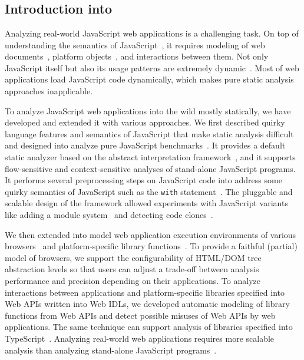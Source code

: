 \chapter{\safe}

\section{Introduction into }
\label{s:2:1:safe1}
Analyzing real-world JavaScript web applications is a challenging task.
On top of understanding the semantics of JavaScript~\cite{ecma5},
it requires modeling of web documents~\cite{W3C}, platform objects~\cite{tizen},
and interactions between them.
Not only JavaScript itself but also its usage patterns are extremely dynamic~\cite{dynamic,eval}.
Most of web applications load JavaScript code dynamically,
which makes pure static analysis approaches inapplicable.

To analyze JavaScript web applications into the wild mostly statically,
we have developed \safe and extended it with various approaches.
We first described quirky language features and semantics of JavaScript
that make static analysis difficult and designed \safe into analyze pure JavaScript
benchmarks~\cite{fool12}.  It provides a default static analyzer based on
the abstract interpretation framework~\cite{ai77},
and it supports flow-sensitive and context-sensitive analyses of stand-alone JavaScript programs.
It performs several preprocessing steps on JavaScript code
into address some quirky semantics of JavaScript such as
the \texttt{with} statement~\cite{dls13}.
The pluggable and scalable design of the framework allowed experiments with JavaScript variants
like adding a module system~\cite{oopsla12,modularity14}
and detecting code clones~\cite{emse16}.


We then extended \safe
into model web application execution environments of various browsers~\cite{ase15a} and
platform-specific library functions~\cite{fse14,safets}.  To provide a faithful (partial) model of browsers,
we support the configurability of HTML/DOM tree abstraction levels 
so that users can adjust a trade-off between analysis performance and precision 
depending on their applications.  To analyze interactions between applications
and platform-specific libraries specified into Web APIs written into Web IDLs,
we developed automatic modeling
of library functions from Web APIs and detect possible misuses of Web APIs
by web applications.  The same technique can support analysis of libraries specified
into TypeScript~\cite{ts}.  Analyzing real-world web applications requires
more scalable analysis than analyzing stand-alone JavaScript programs~\cite{ase15b,ecoop15}.


